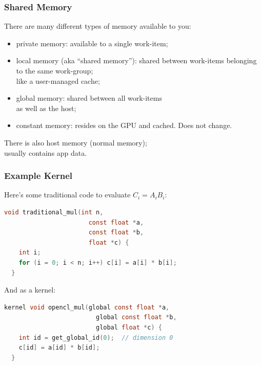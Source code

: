 \begin{frame}
  \frametitle{Shared Memory}


  There are many different types of memory available to you:


\begin{itemize}
\item private memory: available to a single work-item;
\item local memory (aka ``shared memory''): shared between work-items
  belonging to the same work-group; \\ like a user-managed cache;
\item global memory: shared between all work-items\\ as well as the host;
\item constant memory: resides on the GPU and cached. Does not change.
\end{itemize}

There is also host memory (normal memory);\\ usually contains app data.

\end{frame}

\begin{frame}[fragile]
  \frametitle{Example Kernel}


    Here's some traditional code to evaluate $C_i = A_iB_i$:

\begin{lstlisting}[language=C]
  void traditional_mul(int n, 
                       const float *a, 
                       const float *b, 
                       float *c) {
    int i;
    for (i = 0; i < n; i++) c[i] = a[i] * b[i];
  }
\end{lstlisting}


And as a kernel:
\begin{lstlisting}[language=C]
  kernel void opencl_mul(global const float *a, 
                         global const float *b,
                         global float *c) {
    int id = get_global_id(0);  // dimension 0
    c[id] = a[id] * b[id];
  }
\end{lstlisting}


\end{frame}

